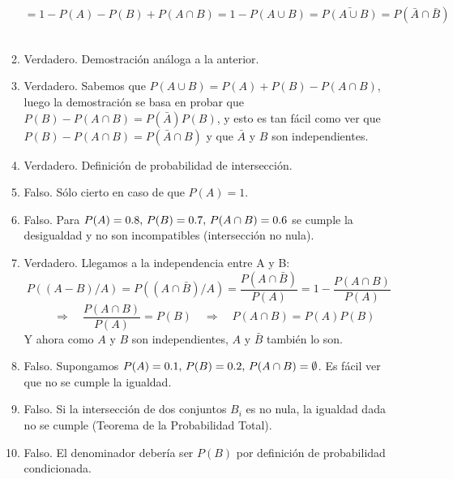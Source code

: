\documentclass[fleqn]{article}
\def\next{\quad \Rightarrow \quad}
\begin{document}
\begin{enumerate}
\begin{enumerate}
                                        $$=1-P(A)-P(B) + P(A\cap B) = 1 - P(A \cup B) = \bar{P(A \cup B)} = P(\bar{A} \cap \bar{B})$$\\
                                \item Verdadero. Demostración análoga a la anterior.\\
                                \item Verdadero. Sabemos que $P(A \cup B) = P(A) + P(B)-P(A \cap B)$, luego la demostración se basa en probar que 
                                        $P(B)-P(A \cap B) = P(\bar{A})P(B)$, y esto es tan fácil como ver que $P(B)-P(A \cap B) = P(\bar{A} \cap B)$
                                        y que $\bar{A}$ y $B$ son independientes.\\
                                \item Verdadero. Definición de probabilidad de intersección.\\
                                \item Falso. Sólo cierto en caso de que $P(A)=1$.\\
                                \item Falso. Para $P(A)=0.8, \thinspace P(B)=0.7, \thinspace P(A \cap B)= 0.6$ se cumple la desigualdad y no son incompatibles
                                        (intersección no nula).\\
                                \item Verdadero. Llegamos a la independencia entre A y B: 
                                        $$P((A-B)/A) = P((A\cap \bar{B})/A) = \frac{P(A\cap \bar{B})}{P(A)} = 1-\frac{P(A\cap B)}{P(A)}$$
                                        $$\next \frac{P(A\cap B)}{P(A)} = P(B) \next P(A\cap B)=P(A)P(B)$$
                                        Y ahora como $A$ y $B$ son independientes, $A$ y $\bar{B}$ también lo son.\\
                                \item Falso. Supongamos $P(A)=0.1, \thinspace P(B)=0.2, \thinspace P(A \cap B)= \emptyset$. Es fácil ver que no se cumple la igualdad.\\
                                \item Falso. Si la intersección de dos conjuntos $B_i$ es no nula, la igualdad dada no se cumple (Teorema de la Probabilidad Total).\\
                                \item Falso. El denominador debería ser $P(B)$ por definición de probabilidad condicionada.\\

\end{enumerate}
\end{enumerate}
\end{document}
